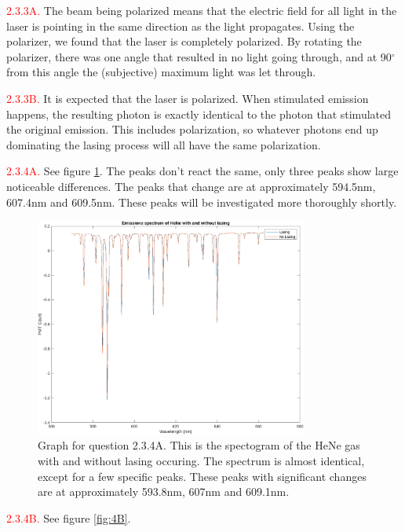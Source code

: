 \documentclass[letterpaper, reqno,11pt]{article}
\begin{document}
\noindent \textcolor{red}{2.3.3A.} The beam being polarized means that the electric field for all light in the laser is pointing in the same direction as the light propagates. Using the polarizer, we found that the laser is completely polarized. By rotating the polarizer, there was one angle that resulted in no light going through, and at 90$^{\circ}$ from this angle the (subjective) maximum light was let through.

\noindent \textcolor{red}{2.3.3B.} It is expected that the laser is polarized. When stimulated emission happens, the resulting photon is exactly identical to the photon that stimulated the original emission. This includes polarization, so whatever photons end up dominating the lasing process will all have the same polarization.

\noindent \textcolor{red}{2.3.4A.} See figure \ref{fig:4A}. The peaks don't react the same, only three peaks show large noticeable differences. The peaks that change are at approximately 594.5nm, 607.4nm and 609.5nm. These peaks will be investigated more thoroughly shortly.

\begin{figure}[htpb]
    \centering
    \includegraphics[width=0.8\textwidth]{4A}
    \caption{Graph for question 2.3.4A. This is the spectogram of the HeNe gas with and without lasing occuring. The spectrum is almost identical, except for a few specific peaks. These peaks with significant changes are at approximately 593.8nm, 607nm and 609.1nm.}
    \label{fig:4A}
\end{figure}

\noindent \textcolor{red}{2.3.4B.} See figure \ref{fig:4B}. 
\end{document}
